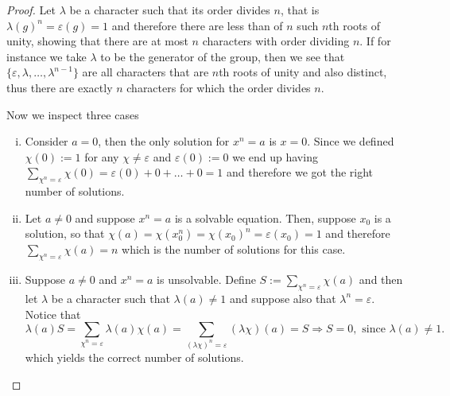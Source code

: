 \begin{proof}
    Let \(\lambda\) be a character such that its order divides \(n\), that is
    \(\lambda(g)^n = \varepsilon(g) = 1\) and therefore there are less than of
    \(n\) such \(n\)th roots of unity, showing that there are at most \(n\)
    characters with order dividing \(n\). If for instance we take \(\lambda\) to
    be the generator of the group, then we see that \(\{\varepsilon, \lambda,
    \dots, \lambda^{n-1}\} \) are all characters that are \(n\)th roots of
    unity and also distinct, thus there are exactly \(n\) characters for which
    the order divides \(n\).

    Now we inspect three cases
    \begin{enumerate}[i.]
        \item Consider \(a = 0\), then the only solution for  \(x^n = a\) is  \(x
              =0\). Since we defined \(\chi(0) := 1\) for any \(\chi \neq
              \varepsilon\) and \(\varepsilon(0) := 0\) we end up having
              \(\sum_{\chi^n = \varepsilon} \chi(0) = \varepsilon(0) + 0 + \dots + 0
              = 1\) and therefore we got the right number of solutions.
        \item Let \(a \neq  0\) and suppose \(x^n = a\) is a solvable equation.
              Then, suppose \(x_0\) is a solution, so that \(\chi(a) = \chi(x_0^n) =
              \chi(x_0)^n = \varepsilon(x_0) = 1\) and therefore \(\sum_{\chi^n =
                  \varepsilon}\chi(a) = n\) which is the number of solutions for this
              case.
        \item Suppose \(a \neq  0\) and \(x^n = a\) is unsolvable. Define \(S :=
              \sum_{\chi^n  = \varepsilon} \chi(a)\) and then let \(\lambda\) be a
              character such that  \(\lambda(a) \neq  1\) and suppose also that
              \(\lambda^n = \varepsilon\). Notice that
              \[
                  \lambda(a) S = \sum_{\chi^n = \varepsilon} \lambda(a)\chi(a) =
                  \sum_{(\lambda \chi)^n = \varepsilon} (\lambda\chi)(a) =  S
                  \Rightarrow S = 0, \text{ since } \lambda(a) \neq  1.
              \]
              which yields the correct number of solutions.
    \end{enumerate}
\end{proof}


